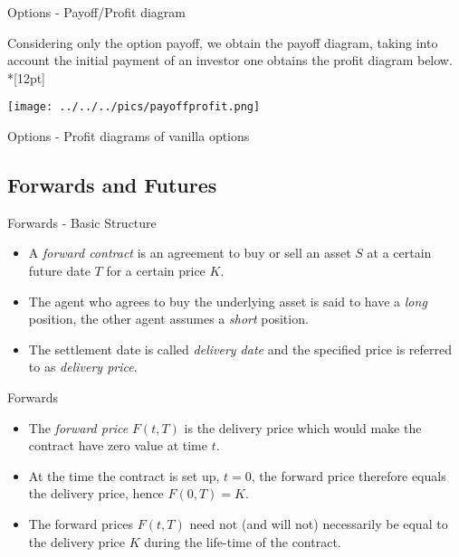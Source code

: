 {Options - Payoff/Profit diagram }

Considering only the option payoff, we obtain the payoff diagram, taking into account the initial payment of an investor one obtains the profit diagram below.\\*[12pt]

\begin{center}
\texttt{[image: ../../../pics/payoffprofit.png]}
\end{center}



{Options - Profit diagrams of vanilla options}
\begin{figure}
  \centering
   \qquad
\end{figure}

\subsection{Forwards and Futures}


{Forwards - Basic Structure}

\begin{itemize}
\item<1->
A {\it forward contract}
is an agreement to buy or sell an asset $S$ at a certain future
date $T$ for a certain price $K$.
\item<2->
The agent who agrees to
buy the underlying asset is said to have a {\it long} position,
the other agent assumes a {\it short} position.
\item<3-> The settlement
date is called {\it delivery date} and the specified price is
referred to as {\it delivery price}.
\end{itemize}



{Forwards}
\begin{itemize}
\item<1-> The {\it forward
price} $F(t,T)$ is the delivery price which would make the
contract have zero value at time $t$.
\item<2-> At the time the contract is set up, $t=0$,
the forward price therefore equals the delivery price, hence
$F(0,T) = K$.
\item<3->
The forward prices $F(t,T)$ need not (and will not)
necessarily be equal to the delivery price $K$ during the
life-time of the contract.
\end{itemize}



